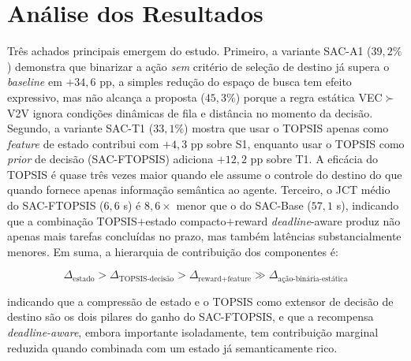 \section{Análise dos Resultados}
\label{sec:resultados}

Três achados principais emergem do estudo. Primeiro, a variante \gls{SAC}-A1 ($39{,}2\%$) demonstra que binarizar a ação \emph{sem} critério de seleção de destino já supera o \textit{baseline} em $+34{,}6$ pp, a simples redução do espaço de busca tem efeito expressivo, mas não alcança a proposta ($45{,}3\%$) porque a regra estática \gls{VEC}$\succ$\gls{V2V} ignora condições dinâmicas de fila e distância no momento da decisão. Segundo, a variante \gls{SAC}-T1 ($33{,}1\%$) mostra que usar o \gls{TOPSIS} apenas como \textit{feature} de estado contribui com $+4{,}3$ pp sobre S1, enquanto usar o \gls{TOPSIS} como \textit{prior} de decisão (\gls{SAC}-FTOPSIS) adiciona $+12{,}2$ pp sobre T1. A eficácia do \gls{TOPSIS} é quase três vezes maior quando ele assume o controle do destino do que quando fornece apenas informação semântica ao agente. Terceiro, o \gls{JCT} médio do \gls{SAC}-FTOPSIS ($6{,}6$ s) é $8{,}6\times$ menor que o do \gls{SAC}-Base ($57{,}1$ s), indicando que a combinação \gls{TOPSIS}$+$estado compacto$+$reward \textit{deadline}-aware produz não apenas mais tarefas concluídas no prazo, mas também latências substancialmente menores. Em suma, a hierarquia de contribuição dos componentes é:

\[
    \Delta_{\text{estado}} > \Delta_{\text{TOPSIS-decisão}} > \Delta_{\text{reward+feature}} \gg \Delta_{\text{ação-binária-estática}}
\]

indicando que a compressão de estado e o \gls{TOPSIS} como extensor de decisão de destino são os dois pilares do ganho do \gls{SAC}-FTOPSIS, e que a recompensa \textit{deadline-aware}, embora importante isoladamente, tem contribuição marginal reduzida quando combinada com um estado já semanticamente rico.


